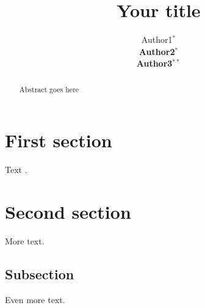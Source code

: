 \documentclass[a4paper,10pt,twoside]{article}
\begin{document}
\title{Your title}

\author{Author1$^*$ \\
{\normalsize \bf Author2}$^*$ \\
{\normalsize \bf Author3}$^{**}$ 
\AND {}
\AND {} }


\maketitle\thispagestyle{empty} %


\begin{abstract}
Abstract goes here
\end{abstract}

\section{First section}

Text \cite{Banko2001a}.

\section{Second section}

More text.

\subsection{Subsection}

Even more text.


 
  
\end{document}
